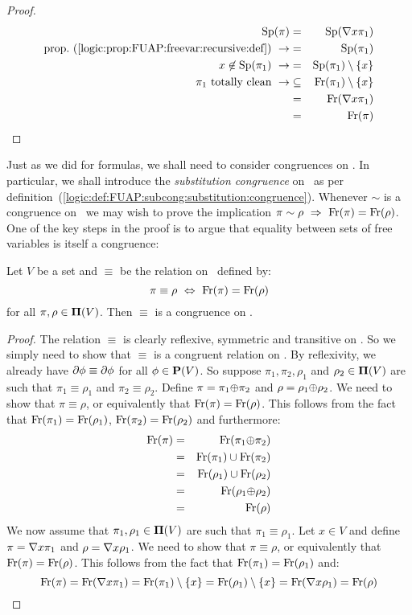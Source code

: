 \begin{proof}
\begin{eqnarray*}
    \spec(\pi)&=&\spec(\gen x\pi_{1})\\
    \mbox{prop.~(\ref{logic:prop:FUAP:freevar:recursive:def})}\ \rightarrow
    &=&\spec(\pi_{1})\\
    x\not\in\spec(\pi_{1})\ \rightarrow
    &=&\spec(\pi_{1})\setminus\{x\}\\
    \mbox{$\pi_{1}$ totally clean}\ \rightarrow
    &\subseteq&\free(\pi_{1})\setminus\{x\}\\
    &=&\free(\gen x\pi_{1})\\
    &=&\free(\pi)\\
    \end{eqnarray*}
\end{proof}

Just as we did for formulas, we shall need to consider congruences
on \pvs. In particular, we shall introduce the {\em substitution
congruence} on \pvs\ as per
definition~(\ref{logic:def:FUAP:subcong:substitution:congruence}).
Whenever $\sim$ is a congruence on \pvs\ we may wish to prove the
implication $\pi\sim\rho\ \Rightarrow\ \free(\pi)=\free(\rho)$. One
of the key steps in the proof is to argue that equality between sets
of free variables is itself a congruence:

\begin{prop}\label{logic:prop:FUAP:freevarproof:congruence}
Let $V$ be a set and $\equiv$ be the relation on \pvs\ defined by:
    \[
    \pi\equiv\rho\ \Leftrightarrow\ \free(\pi)=\free(\rho)
    \]
for all $\pi,\rho\in\mbox{${\bf\Pi}(V)$}$. Then $\equiv$ is a congruence on \pvs.
\end{prop}
\begin{proof}
The relation $\equiv$ is clearly reflexive, symmetric and transitive
on \pvs. So we simply need to show that $\equiv$ is a congruent
relation on \pvs. By reflexivity, we already have
$\mbox{$\partial$}\phi\equiv\mbox{$\partial$}\phi$ for all $\phi\in\mbox{${\bf P}(V)$}$. So suppose
$\pi_{1},\pi_{2},\rho_{1}$ and $\rho_{2}\in\mbox{${\bf\Pi}(V)$}$ are such that
$\pi_{1}\equiv\rho_{1}$ and $\pi_{2}\equiv\rho_{2}$. Define
$\pi=\pi_{1}\mbox{$\oplus$}\pi_{2}$ and $\rho=\rho_{1}\mbox{$\oplus$}\rho_{2}$. We need to
show that $\pi\equiv\rho$, or equivalently that
$\mbox{\rm Fr}(\pi)=\mbox{\rm Fr}(\rho)$. This follows from the fact that
$\mbox{\rm Fr}(\pi_{1})=\mbox{\rm Fr}(\rho_{1})$, $\mbox{\rm Fr}(\pi_{2})=\mbox{\rm Fr}(\rho_{2})$
and furthermore:
    \begin{eqnarray*}
    \mbox{\rm Fr}(\pi)&=&\mbox{\rm Fr}(\pi_{1}\mbox{$\oplus$}\pi_{2})\\
    &=&\mbox{\rm Fr}(\pi_{1})\cup\mbox{\rm Fr}(\pi_{2})\\
    &=&\mbox{\rm Fr}(\rho_{1})\cup\mbox{\rm Fr}(\rho_{2})\\
    &=&\mbox{\rm Fr}(\rho_{1}\mbox{$\oplus$}\rho_{2})\\
    &=&\mbox{\rm Fr}(\rho)
    \end{eqnarray*}
We now assume that $\pi_{1},\rho_{1}\in\mbox{${\bf\Pi}(V)$}$ are such that
$\pi_{1}\equiv\rho_{1}$. Let $x\in V$ and define $\pi=\mbox{$\nabla$} x\pi_{1}$
and $\rho=\mbox{$\nabla$} x\rho_{1}$. We need to show that $\pi\equiv\rho$, or
equivalently that $\mbox{\rm Fr}(\pi)=\mbox{\rm Fr}(\rho)$. This follows from the
fact that $\mbox{\rm Fr}(\pi_{1})=\mbox{\rm Fr}(\rho_{1})$ and:
    \[
    \mbox{\rm Fr}(\pi)=\mbox{\rm Fr}(\mbox{$\nabla$} x\pi_{1})
    =\mbox{\rm Fr}(\pi_{1})\setminus\{x\}
    =\mbox{\rm Fr}(\rho_{1})\setminus\{x\}
    =\mbox{\rm Fr}(\mbox{$\nabla$} x\rho_{1})
    =\mbox{\rm Fr}(\rho)
    \]
\end{proof}
